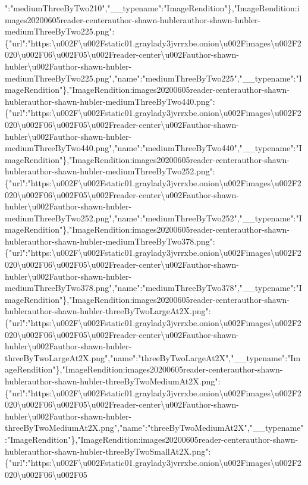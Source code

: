 ":"mediumThreeByTwo210","\_\_typename":"ImageRendition"\},"ImageRendition:images20200605reader-centerauthor-shawn-hublerauthor-shawn-hubler-mediumThreeByTwo225.png":\{"url":"https:\textbackslash{}u002F\textbackslash{}u002Fstatic01.graylady3jvrrxbe.onion\textbackslash{}u002Fimages\textbackslash{}u002F2020\textbackslash{}u002F06\textbackslash{}u002F05\textbackslash{}u002Freader-center\textbackslash{}u002Fauthor-shawn-hubler\textbackslash{}u002Fauthor-shawn-hubler-mediumThreeByTwo225.png","name":"mediumThreeByTwo225","\_\_typename":"ImageRendition"\},"ImageRendition:images20200605reader-centerauthor-shawn-hublerauthor-shawn-hubler-mediumThreeByTwo440.png":\{"url":"https:\textbackslash{}u002F\textbackslash{}u002Fstatic01.graylady3jvrrxbe.onion\textbackslash{}u002Fimages\textbackslash{}u002F2020\textbackslash{}u002F06\textbackslash{}u002F05\textbackslash{}u002Freader-center\textbackslash{}u002Fauthor-shawn-hubler\textbackslash{}u002Fauthor-shawn-hubler-mediumThreeByTwo440.png","name":"mediumThreeByTwo440","\_\_typename":"ImageRendition"\},"ImageRendition:images20200605reader-centerauthor-shawn-hublerauthor-shawn-hubler-mediumThreeByTwo252.png":\{"url":"https:\textbackslash{}u002F\textbackslash{}u002Fstatic01.graylady3jvrrxbe.onion\textbackslash{}u002Fimages\textbackslash{}u002F2020\textbackslash{}u002F06\textbackslash{}u002F05\textbackslash{}u002Freader-center\textbackslash{}u002Fauthor-shawn-hubler\textbackslash{}u002Fauthor-shawn-hubler-mediumThreeByTwo252.png","name":"mediumThreeByTwo252","\_\_typename":"ImageRendition"\},"ImageRendition:images20200605reader-centerauthor-shawn-hublerauthor-shawn-hubler-mediumThreeByTwo378.png":\{"url":"https:\textbackslash{}u002F\textbackslash{}u002Fstatic01.graylady3jvrrxbe.onion\textbackslash{}u002Fimages\textbackslash{}u002F2020\textbackslash{}u002F06\textbackslash{}u002F05\textbackslash{}u002Freader-center\textbackslash{}u002Fauthor-shawn-hubler\textbackslash{}u002Fauthor-shawn-hubler-mediumThreeByTwo378.png","name":"mediumThreeByTwo378","\_\_typename":"ImageRendition"\},"ImageRendition:images20200605reader-centerauthor-shawn-hublerauthor-shawn-hubler-threeByTwoLargeAt2X.png":\{"url":"https:\textbackslash{}u002F\textbackslash{}u002Fstatic01.graylady3jvrrxbe.onion\textbackslash{}u002Fimages\textbackslash{}u002F2020\textbackslash{}u002F06\textbackslash{}u002F05\textbackslash{}u002Freader-center\textbackslash{}u002Fauthor-shawn-hubler\textbackslash{}u002Fauthor-shawn-hubler-threeByTwoLargeAt2X.png","name":"threeByTwoLargeAt2X","\_\_typename":"ImageRendition"\},"ImageRendition:images20200605reader-centerauthor-shawn-hublerauthor-shawn-hubler-threeByTwoMediumAt2X.png":\{"url":"https:\textbackslash{}u002F\textbackslash{}u002Fstatic01.graylady3jvrrxbe.onion\textbackslash{}u002Fimages\textbackslash{}u002F2020\textbackslash{}u002F06\textbackslash{}u002F05\textbackslash{}u002Freader-center\textbackslash{}u002Fauthor-shawn-hubler\textbackslash{}u002Fauthor-shawn-hubler-threeByTwoMediumAt2X.png","name":"threeByTwoMediumAt2X","\_\_typename":"ImageRendition"\},"ImageRendition:images20200605reader-centerauthor-shawn-hublerauthor-shawn-hubler-threeByTwoSmallAt2X.png":\{"url":"https:\textbackslash{}u002F\textbackslash{}u002Fstatic01.graylady3jvrrxbe.onion\textbackslash{}u002Fimages\textbackslash{}u002F2020\textbackslash{}u002F06\textbackslash{}u002F05\textb
